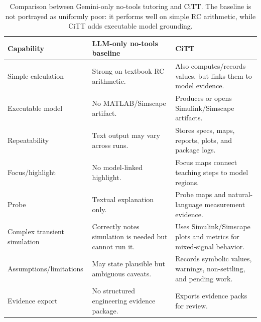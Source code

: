 \begin{table}[t]
\centering
\small
\begin{tabular}{p{}p{}p{}}
\toprule
Capability & LLM-only no-tools baseline & CiTT \\
\midrule
Simple calculation & Strong on textbook RC arithmetic. & Also computes/records values, but links them to model evidence. \\
Executable model & No MATLAB/Simscape artifact. & Produces or opens Simulink/Simscape artifacts. \\
Repeatability & Text output may vary across runs. & Stores specs, maps, reports, plots, and package logs. \\
Focus/highlight & No model-linked highlight. & Focus maps connect teaching steps to model regions. \\
Probe & Textual explanation only. & Probe maps and natural-language measurement evidence. \\
Complex transient simulation & Correctly notes simulation is needed but cannot run it. & Uses Simulink/Simscape plots and metrics for mixed-signal behavior. \\
Assumptions/limitations & May state plausible but ambiguous caveats. & Records symbolic values, warnings, non-settling, and pending work. \\
Evidence export & No structured engineering evidence package. & Exports evidence packs for review. \\
\bottomrule
\end{tabular}
\caption{Comparison between Gemini-only no-tools tutoring and CiTT. The baseline is not portrayed as uniformly poor: it performs well on simple RC arithmetic, while CiTT adds executable model grounding.}
\label{tab:llm_vs_citt}
\end{table}
